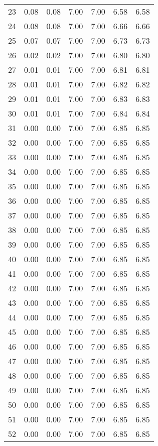 \documentclass[12pt,letterpaper]{article}
\begin{document}
\begin{center}
\begin{longtable}{r|r|r|r|r|r|r}
23 & 0.08 & 0.08 & 7.00 & 7.00 & 6.58 & 6.58\\
24 & 0.08 & 0.08 & 7.00 & 7.00 & 6.66 & 6.66\\
25 & 0.07 & 0.07 & 7.00 & 7.00 & 6.73 & 6.73\\
26 & 0.02 & 0.02 & 7.00 & 7.00 & 6.80 & 6.80\\
27 & 0.01 & 0.01 & 7.00 & 7.00 & 6.81 & 6.81\\
28 & 0.01 & 0.01 & 7.00 & 7.00 & 6.82 & 6.82\\
29 & 0.01 & 0.01 & 7.00 & 7.00 & 6.83 & 6.83\\
30 & 0.01 & 0.01 & 7.00 & 7.00 & 6.84 & 6.84\\
31 & 0.00 & 0.00 & 7.00 & 7.00 & 6.85 & 6.85\\
32 & 0.00 & 0.00 & 7.00 & 7.00 & 6.85 & 6.85\\
33 & 0.00 & 0.00 & 7.00 & 7.00 & 6.85 & 6.85\\
34 & 0.00 & 0.00 & 7.00 & 7.00 & 6.85 & 6.85\\
35 & 0.00 & 0.00 & 7.00 & 7.00 & 6.85 & 6.85\\
36 & 0.00 & 0.00 & 7.00 & 7.00 & 6.85 & 6.85\\
37 & 0.00 & 0.00 & 7.00 & 7.00 & 6.85 & 6.85\\
38 & 0.00 & 0.00 & 7.00 & 7.00 & 6.85 & 6.85\\
39 & 0.00 & 0.00 & 7.00 & 7.00 & 6.85 & 6.85\\
40 & 0.00 & 0.00 & 7.00 & 7.00 & 6.85 & 6.85\\
41 & 0.00 & 0.00 & 7.00 & 7.00 & 6.85 & 6.85\\
42 & 0.00 & 0.00 & 7.00 & 7.00 & 6.85 & 6.85\\
43 & 0.00 & 0.00 & 7.00 & 7.00 & 6.85 & 6.85\\
44 & 0.00 & 0.00 & 7.00 & 7.00 & 6.85 & 6.85\\
45 & 0.00 & 0.00 & 7.00 & 7.00 & 6.85 & 6.85\\
46 & 0.00 & 0.00 & 7.00 & 7.00 & 6.85 & 6.85\\
47 & 0.00 & 0.00 & 7.00 & 7.00 & 6.85 & 6.85\\
48 & 0.00 & 0.00 & 7.00 & 7.00 & 6.85 & 6.85\\
49 & 0.00 & 0.00 & 7.00 & 7.00 & 6.85 & 6.85\\
50 & 0.00 & 0.00 & 7.00 & 7.00 & 6.85 & 6.85\\
51 & 0.00 & 0.00 & 7.00 & 7.00 & 6.85 & 6.85\\
52 & 0.00 & 0.00 & 7.00 & 7.00 & 6.85 & 6.85\\

\end{longtable}
\end{center}
\end{document}
